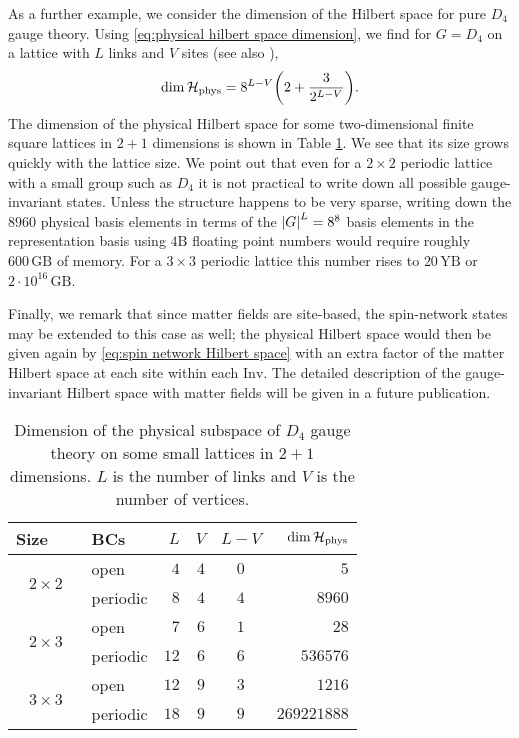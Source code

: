\medskip

As a further example, we consider the dimension of the Hilbert space for pure $D_4$ gauge theory.
Using \eqref{eq:physical hilbert space dimension}, we find for $G=D_4$ on a lattice with $L$ links and $V$ sites (see also \cite{marchesethesis}),
\begin{equation}
    \dim{\HilbertPhys} = 8^{L-V}\pqty{2+\frac{3}{2^{L-V}}}.
\end{equation}
The dimension of the physical Hilbert space for some two-dimensional finite square lattices in $2+1$ dimensions is shown in Table \ref{tab:numstates}.
We see that its size grows quickly with the lattice size.
We point out that even for a $2 \times 2$ periodic lattice with a small group such as $D_4$ it is not practical to write down all possible gauge-invariant states.
Unless the structure happens to be very sparse, writing down the $8960$ physical basis elements in terms of the $\abs{G}^L = 8^8$ basis elements in the representation basis using $4 \mathrm{B}$ floating point numbers would require roughly $600 \,\mathrm{GB}$ of memory.
For a  $3 \times 3$ periodic lattice this number rises to $20\, \mathrm{YB}$ or $2 \cdot 10^{16}\, \mathrm{GB}$.


Finally, we remark that since matter fields are site-based, the spin-network states may be extended to this case as well; the physical Hilbert space would then be given again by \eqref{eq:spin network Hilbert space} with an extra factor of the matter Hilbert space at each site within each $\mathrm{Inv}$. The detailed description of the gauge-invariant Hilbert space with matter fields will be given in a future publication.


\begin{table}[t]
    \centering
    \begin{tabular}{clrrcr}
        \toprule
        Size~~~ & BCs & $L$ & $V$ & $L-V$ &$\dim{\mathcal{H}_{\text{phys}}}$\\
        \midrule
        \multirow{2}{3em}{$2 \times 2$}
            & open & $4$ & $4$ & $0$ & $5$\\
            & periodic & $8$ & $4$ & $4$ & $8960$ \\[5pt]
        \multirow{2}{3em}{$2 \times 3$}
            & open & $7$ & $6$ & $1$ & $28$ \\
            & periodic & $12$ & $6$ & $6$ & $536576$ \\[5pt]
        \multirow{2}{3em}{$3 \times 3$}
            & open & $12$ & $9$ & $3$ & $1216$ \\
            & periodic & $18$ & $9$ & $9$ & $269221888$ \\
        \bottomrule
    \end{tabular}
    \caption{Dimension of the physical subspace of $D_4$ gauge theory on some small lattices in $2+1$ dimensions. $L$ is the number of links and $V$ is the number of vertices.}
    \label{tab:numstates}
\end{table}



